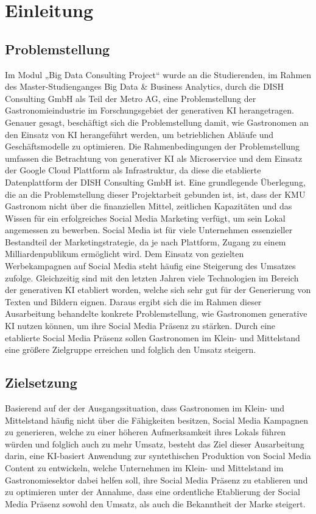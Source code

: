 \section{Einleitung}
\subsection{Problemstellung}
Im Modul „Big Data Consulting Project“ wurde an die Studierenden, im Rahmen des Master-Studienganges Big Data \& Business Analytics, durch die DISH Consulting GmbH als Teil der Metro AG, eine Problemstellung der Gastronomieindustrie im Forschungsgebiet der generativen \ac{KI} herangetragen.
Genauer gesagt, beschäftigt sich die Problemstellung damit, wie Gastronomen an den Einsatz von \ac{KI} herangeführt werden, um betrieblichen Abläufe und Geschäftsmodelle zu optimieren.
Die Rahmenbedingungen der Problemstellung umfassen die Betrachtung von generativer \ac{KI} als Microservice und dem Einsatz der Google Cloud Plattform als Infrastruktur, da diese die etablierte Datenplattform der DISH Consulting GmbH ist.
Eine grundlegende Überlegung, die an die Problemstellung dieser Projektarbeit gebunden ist, ist, dass der \ac{KMU} Gastronom nicht über die finanziellen Mittel, zeitlichen Kapazitäten und das Wissen für ein erfolgreiches Social Media Marketing verfügt, um sein Lokal angemessen zu bewerben.
Social Media ist für viele Unternehmen essenzieller Bestandteil der Marketingstrategie, da je nach Plattform, Zugang zu einem Milliardenpublikum ermöglicht wird.
Dem Einsatz von gezielten Werbekampagnen auf Social Media steht häufig eine Steigerung des Umsatzes zufolge.
Gleichzeitig sind mit den letzten Jahren viele Technologien im Bereich der generativen \ac{KI} etabliert worden, welche sich sehr gut für der Generierung von Texten und Bildern eignen.
Daraus ergibt sich die im Rahmen dieser Ausarbeitung behandelte konkrete Problemstellung, wie Gastronomen generative \ac{KI} nutzen können, um ihre Social Media Präsenz zu stärken.
Durch eine etablierte Social Media Präsenz sollen Gastronomen im Klein- und Mittelstand eine größere Zielgruppe erreichen und folglich den Umsatz steigern.
\subsection{Zielsetzung}
Basierend auf der der Ausgangssituation, dass Gastronomen im Klein- und Mittelstand häufig nicht über die Fähigkeiten besitzen, Social Media Kampagnen zu generieren, welche zu einer höheren Aufmerksamkeit ihres Lokals führen würden und folglich auch zu mehr Umsatz, besteht das Ziel dieser Ausarbeitung darin, eine KI-basiert Anwendung zur syntethischen Produktion von Social Media Content zu entwickeln, welche Unternehmen im Klein- und Mittelstand im Gastronomiesektor dabei helfen soll, ihre Social Media Präsenz zu etablieren und zu optimieren unter der Annahme, dass eine ordentliche Etablierung der Social Media Präsenz sowohl den Umsatz, als auch die Bekanntheit der Marke steigert.
